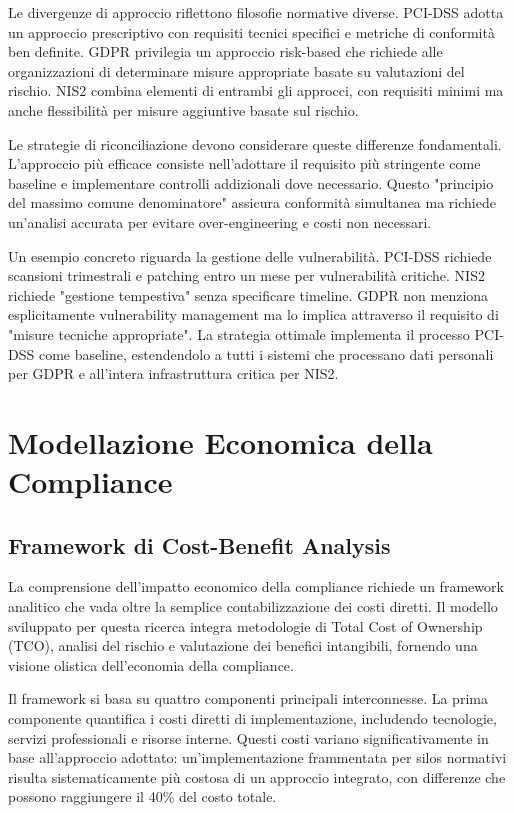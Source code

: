 Le divergenze di approccio riflettono filosofie normative diverse. PCI-DSS adotta un approccio prescriptivo con requisiti tecnici specifici e metriche di conformità ben definite. GDPR privilegia un approccio risk-based che richiede alle organizzazioni di determinare misure appropriate basate su valutazioni del rischio. NIS2 combina elementi di entrambi gli approcci, con requisiti minimi ma anche flessibilità per misure aggiuntive basate sul rischio.

Le strategie di riconciliazione devono considerare queste differenze fondamentali. L'approccio più efficace consiste nell'adottare il requisito più stringente come baseline e implementare controlli addizionali dove necessario. Questo "principio del massimo comune denominatore" assicura conformità simultanea ma richiede un'analisi accurata per evitare over-engineering e costi non necessari.

Un esempio concreto riguarda la gestione delle vulnerabilità. PCI-DSS richiede scansioni trimestrali e patching entro un mese per vulnerabilità critiche. NIS2 richiede "gestione tempestiva" senza specificare timeline. GDPR non menziona esplicitamente vulnerability management ma lo implica attraverso il requisito di "misure tecniche appropriate". La strategia ottimale implementa il processo PCI-DSS come baseline, estendendolo a tutti i sistemi che processano dati personali per GDPR e all'intera infrastruttura critica per NIS2.

\section{Modellazione Economica della Compliance}

\subsection{Framework di Cost-Benefit Analysis}

La comprensione dell'impatto economico della compliance richiede un framework analitico che vada oltre la semplice contabilizzazione dei costi diretti. Il modello sviluppato per questa ricerca integra metodologie di Total Cost of Ownership (TCO), analisi del rischio e valutazione dei benefici intangibili, fornendo una visione olistica dell'economia della compliance.

Il framework si basa su quattro componenti principali interconnesse. La prima componente quantifica i costi diretti di implementazione, includendo tecnologie, servizi professionali e risorse interne. Questi costi variano significativamente in base all'approccio adottato: un'implementazione frammentata per silos normativi risulta sistematicamente più costosa di un approccio integrato, con differenze che possono raggiungere il 40\% del costo totale.

